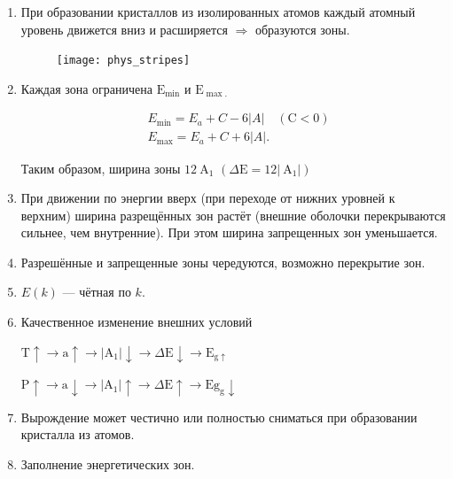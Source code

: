 \begin{enumerate}
    \item При образовании кристаллов из изолированных атомов каждый атомный уровень движется вниз и расширяется $\Rightarrow$ образуются зоны.
    
    \begin{figure}[h!]
        \centering
        \texttt{[image: phys\_stripes]}
    \end{figure}

    \item Каждая зона ограничена $\mathrm{E}_{\min }$ и $\mathrm{E}_{\max .}$
    
    $$
    \begin{aligned}
    & E_{\min }=E_{a}+C-6|A| \quad (\mathrm{C}<0) \\
    & E_{\max }=E_{a}+C+6|A| .
    \end{aligned}
    $$


    Таким образом, ширина зоны $12 \mathrm{~A}_{1}$ $\left(\Delta \mathrm{E}=12\left|\mathrm{~A}_{1}\right|\right)$


    \item  При движении по энергии вверх (при переходе от нижних уровней к верхним) ширина разрещённых зон растёт (внешние оболочки перекрываются сильнее, чем внутренние). При этом ширина запрещенных зон уменьшается.
    \item Разрешённые и запрещенные зоны чередуются, возможно перекрытие зон.
    \item $E(k)$ --- чётная по $k$.
    \item Качественное изменение внешних условий
    
    $\mathrm{T} \uparrow \rightarrow \mathrm{a} \uparrow \rightarrow\left|\mathrm{A}_{1}\right| \downarrow \rightarrow \Delta \mathrm{E} \downarrow \rightarrow \mathrm{E}_{\mathrm{g} \uparrow}$

    $\mathrm{P} \uparrow \rightarrow \mathrm{a} \downarrow \rightarrow\left|\mathrm{A}_{1}\right| \uparrow \rightarrow \Delta \mathrm{E} \uparrow \rightarrow \mathrm{Eg}_{\mathrm{g}} \downarrow$

    \item Вырождение может честично или полностью сниматься при образовании кристалла из атомов.
    \item Заполнение энергетических зон.
\end{enumerate}







